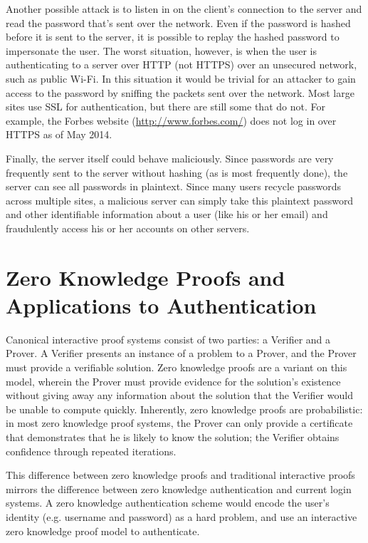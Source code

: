 \documentclass[11pt]{article}
\begin{document}
Another possible attack is to listen in on the client’s connection to the server and read the password that’s sent over the network.  Even if the password is hashed before it is sent to the server, it is possible to replay the hashed password to impersonate the user.  The worst situation, however, is when the user is authenticating to a server over HTTP (not HTTPS) over an unsecured network, such as public Wi-Fi.  In this situation it would be trivial for an attacker to gain access to the password by sniffing the packets sent over the network. Most large sites use SSL for authentication, but there are still some that do not.  For example, the Forbes website (\url{http://www.forbes.com/}) does not log in over HTTPS as of May 2014.

Finally, the server itself could behave maliciously. Since passwords are very frequently sent to the server without hashing (as is most frequently done), the server can see all passwords in plaintext. Since many users recycle passwords across multiple sites, a malicious server can simply take this plaintext password and other identifiable information about a user (like his or her email) and fraudulently access his or her accounts on other servers.

\section{Zero Knowledge Proofs and Applications to Authentication}

Canonical interactive proof systems consist of two parties: a Verifier and a Prover.  A Verifier presents an instance of a problem to a Prover, and the Prover must provide a verifiable solution.  Zero knowledge proofs are a variant on this model, wherein the Prover must provide evidence for the solution’s existence without giving away any information about the solution that the Verifier would be unable to compute quickly.  Inherently, zero knowledge proofs are probabilistic: in most zero knowledge proof systems, the Prover can only provide a certificate that demonstrates that he is likely to know the solution; the Verifier obtains confidence through repeated iterations.

This difference between zero knowledge proofs and traditional interactive proofs mirrors the difference between zero knowledge authentication and current login systems.  A zero knowledge authentication scheme would encode the user’s identity (e.g. username and password) as a hard problem, and use an interactive zero knowledge proof model to authenticate.
\end{document}
